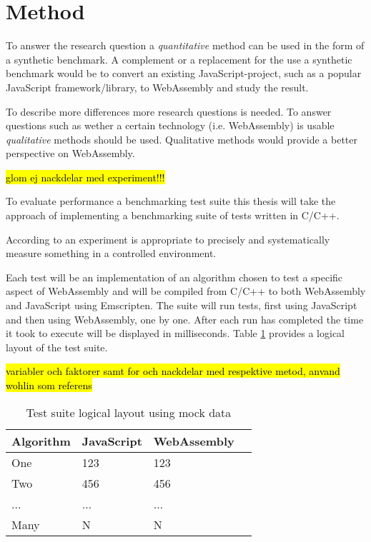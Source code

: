 \section{Method}
\label{method}

To answer the research question a \emph{quantitative} method can be used in the form of a synthetic benchmark. A complement or a replacement for the use a synthetic benchmark would be to convert an existing JavaScript-project, such as a popular JavaScript framework/library, to WebAssembly and study the result.

To describe more differences more research questions is needed. To answer questions such as wether a certain technology (i.e. WebAssembly) is usable \emph{qualitative} methods should be used. Qualitative methods would provide a better perspective on WebAssembly.

\hl{glom ej nackdelar med experiment!!!}

To evaluate performance a benchmarking test suite this thesis will take the approach of implementing a benchmarking suite of tests written in C/C++. 

According to \textcite{WohlinRunesonHostOhlssonRegnellWesslen2012} an experiment is appropriate to precisely and systematically measure something in a controlled environment.

Each test will be an implementation of an algorithm chosen to test a specific aspect of WebAssembly and will be compiled from C/C++ to both WebAssembly and JavaScript using Emscripten. The suite will run tests, first using JavaScript and then using WebAssembly, one by one. After each run has completed the time it took to execute will be displayed in milliseconds. Table \ref{table:suite} provides a logical layout of the test suite.

\hl{variabler och faktorer samt for och nackdelar med respektive metod, anvand wohlin som referens}

\begin{table}[h!]
\centering
\begin{tabular}{@{}llll@{}} 
\hline
 Algorithm & JavaScript & WebAssembly \\ [0.5ex] 
 \hline
 One & 123 & 123 \\ 
 Two & 456 & 456 \\
 ... & ... & ... \\
 Many & N & N \\ [1ex] 
 \hline
\end{tabular}
\caption{Test suite logical layout using mock data}
\label{table:suite}
\end{table}


